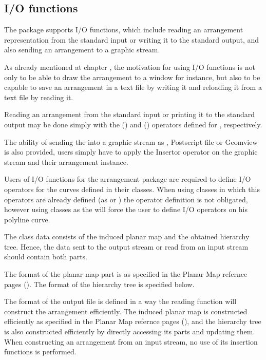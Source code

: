\begin{ccAdvanced}
\subsection*{I/O functions}
The  package supports I/O functions, which include reading 
an arrangement representation from 
the standard input or writing it to the standard output, 
and also sending an arrangement to a graphic stream.

As already mentioned at chapter , the motivation for using 
I/O functions is not only to be able to draw the arrangement 
to a window for instance, but also to be capable to save an arrangement 
in a text file by writing it and reloading it from a text file by reading it. 
 
Reading an arrangement from the standard input or printing it to the
standard output may be done simply with the  (\ccc{ >>
}) and  (\ccc{ << }) operators defined for
, respectively. 


The ability of sending the  
into a graphic stream as , Postscript file or
Geomview is also provided, users simply have to apply the Insertor
operator on the graphic stream and their arrangement instance.

Users of I/O functions for the arrangement package are required to define I/O 
operators for the curves defined in their  classes. 
When using  classes in which this operators are already defined 
(as  or  ) the operator definition is not obligated, 
however using  classes as the  will force the user to define 
I/O operators on his polyline curve.


The  class data consists of the induced planar map and the 
obtained hierarchy tree. Hence, the data sent to the output stream or 
read from an input stream should contain both parts. 

The format of the planar map part is as specified in the Planar Map 
refernce pages (). 
The format of the hierarchy tree is specified below.

The format of the output file is defined in a way the reading function 
will construct the arrangement efficiently. 
The induced planar map is constructed efficiently as specified in the Planar Map refernce pages (), and the hierarchy tree is also 
constructed efficiently by directly accessing its parts and updating them. 
When constructing an arrangement from an input stream, no use of its 
insertion functions is performed.
 

\end{ccAdvanced}
